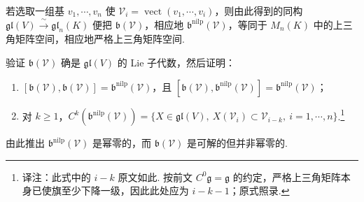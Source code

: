 \begin{remark*}
若选取一组基 $v_1, \cdots, v_n$ 使 $\mathcal{V}_i = \operatorname{vect}(v_1, \cdots, v_i)$，则由此得到的同构 $\mathfrak{gl}(V) \xrightarrow{\ \sim\ } \mathfrak{gl}_n(K)$ 便把 $\mathfrak{b}(\mathcal{V})$，相应地 $\mathfrak{b}^{\mathrm{nilp}}(\mathcal{V})$，等同于 $M_n(K)$ 中的上三角矩阵空间，相应地严格上三角矩阵空间.
\end{remark*}
\begin{exercise*}
验证 $\mathfrak{b}(\mathcal{V})$ 确是 $\mathfrak{gl}(V)$ 的 Lie 子代数，然后证明：
\begin{enumerate}[label=\roman*)]
\item $[\mathfrak{b}(\mathcal{V}), \mathfrak{b}(\mathcal{V})] = \mathfrak{b}^{\mathrm{nilp}}(\mathcal{V})$，且 $[\mathfrak{b}(\mathcal{V}), \mathfrak{b}^{\mathrm{nilp}}(\mathcal{V})] = \mathfrak{b}^{\mathrm{nilp}}(\mathcal{V})$；
\item 对 $k \geqslant 1$，$C^k(\mathfrak{b}^{\mathrm{nilp}}(\mathcal{V})) = \{X \in \mathfrak{gl}(V),\ X(\mathcal{V}_i) \subset \mathcal{V}_{i-k},\ i = 1, \cdots, n\}$.\footnote{译注：此式中的 $i-k$ 原文如此. 按前文 $C^0\mathfrak g=\mathfrak g$ 的约定，严格上三角矩阵本身已使旗至少下降一级，因此此处应为 $i-k-1$；原式照录.}
\end{enumerate}
由此推出 $\mathfrak{b}^{\mathrm{nilp}}(\mathcal{V})$ 是幂零的，而 $\mathfrak{b}(\mathcal{V})$ 是可解的但并非幂零的.
\end{exercise*}


